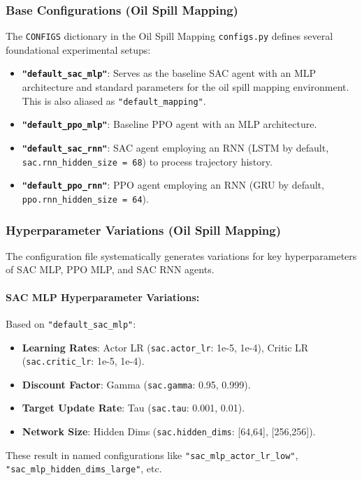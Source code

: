 \documentclass[11pt,a4paper]{article}
\newcommand{\code}[1]{\texttt{#1}} %
\begin{document}
\subsubsection{Base Configurations (Oil Spill Mapping)}
The \code{CONFIGS} dictionary in the Oil Spill Mapping \code{configs.py} defines several foundational experimental setups:
\begin{itemize}
    \item \textbf{\code{"default\_sac\_mlp"}}: Serves as the baseline SAC agent with an MLP architecture and standard parameters for the oil spill mapping environment. This is also aliased as \code{"default\_mapping"}.
    \item \textbf{\code{"default\_ppo\_mlp"}}: Baseline PPO agent with an MLP architecture.
    \item \textbf{\code{"default\_sac\_rnn"}}: SAC agent employing an RNN (LSTM by default, \code{sac.rnn\_hidden\_size = 68}) to process trajectory history.
    \item \textbf{\code{"default\_ppo\_rnn"}}: PPO agent employing an RNN (GRU by default, \code{ppo.rnn\_hidden\_size = 64}).
\end{itemize}

\subsubsection{Hyperparameter Variations (Oil Spill Mapping)}
The configuration file systematically generates variations for key hyperparameters of SAC MLP, PPO MLP, and SAC RNN agents.

\paragraph{SAC MLP Hyperparameter Variations:} Based on \code{"default\_sac\_mlp"}:
\begin{itemize}
    \item \textbf{Learning Rates}: Actor LR (\code{sac.actor\_lr}: 1e-5, 1e-4), Critic LR (\code{sac.critic\_lr}: 1e-5, 1e-4).
    \item \textbf{Discount Factor}: Gamma (\code{sac.gamma}: 0.95, 0.999).
    \item \textbf{Target Update Rate}: Tau (\code{sac.tau}: 0.001, 0.01).
    \item \textbf{Network Size}: Hidden Dims (\code{sac.hidden\_dims}: [64,64], [256,256]).
\end{itemize}
These result in named configurations like \code{"sac\_mlp\_actor\_lr\_low"}, \code{"sac\_mlp\_hidden\_dims\_large"}, etc.
\end{document}
